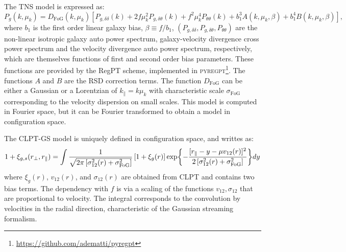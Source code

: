 The TNS model is expressed as:
\begin{equation}
    P_g(k, \mu_k) = D_\text{FoG}(k, \mu_k) 
    \left[ 
        P_{g, \delta \delta}(k) + 2 f \mu_k^2 P_{g, \delta \theta}(k) + f^2 \mu_k^4 P_{\theta \theta}(k)
        + b_1^3 A(k, \mu_k, \beta) + b_1^4 B(k, \mu_k, \beta)
    \right],
    \label{eq:tns_model}
\end{equation}
where $b_1$ is the first order linear galaxy bias, $\beta \equiv f/b_1$, 
$(P_{g, \delta \delta}, P_{g, \delta \theta},P_{\theta \theta})$ are the non-linear isotropic galaxy 
auto power spectrum, galaxy-velocity divergence cross power spectrum and the velocity divergence auto power spectrum, respectively, 
which are themselves functions of first and second order bias parameters. These functions are provided by 
the RegPT scheme, implemented in \textsc{pyregpt}\footnote{\url{https://github.com/adematti/pyregpt}}.
The functions $A$ and $B$ are the RSD correction terms. The function $D_\text{FoG}$ can be either a Gaussian or a Lorentzian
of $k_\parallel = k\mu_k$
with characteristic scale $\sigma_\text{FoG}$ corresponding to the velocity dispersion on small scales. 
This model is computed in Fourier space, but it can be Fourier transformed to obtain a model in configuration space. 

The CLPT-GS model is uniquely defined in configuration space, and writtes as: 
\begin{equation}
 1 + \xi_{g,s}({r_\perp}, {r_\parallel}) = 
  \int  \frac{1}{\sqrt{2\pi \left[\sigma_{12}^2(r)+\sigma^2_\text{FoG}\right]}}
  \left[1+\xi_g(r)\right] 
  \exp{ - \frac{[r_\parallel-y-\mu v_{12}(r)]^2}
               {2\left[\sigma_{12}^2(r)+\sigma^2_\text{FoG}\right]}} dy
 \label{eq:clptgs_model}
\end{equation}
where $\xi_g(r)$, $v_{12}(r)$, and $\sigma_{12}(r)$ are obtained 
from CLPT and contains two bias terms. The dependency with $f$ is via a scaling of 
the functions $v_{12}, \sigma_{12}$ that are proportional to velocity. 
The integral corresponds to the convolution by velocities in the radial direction, 
characteristic of the Gaussian streaming formalism. 

